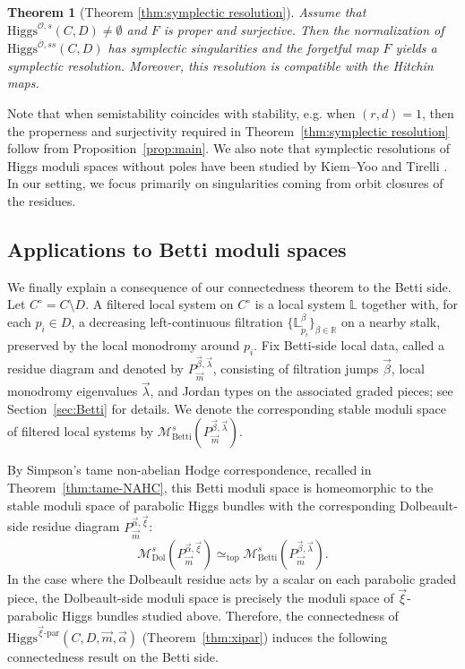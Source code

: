 \documentclass[11pt]{amsart}
\theoremstyle{plain}
\newtheorem{theorem}{Theorem}[section]
\theoremstyle{definition}
\theoremstyle{remark}
\newcommand{\cO}{\mathcal O}
\newcommand{\Higgs}{\mathrm{Higgs}}
\def\a{\alpha}
\def\vxi{\vec{\xi}}
\def\vm{\vec{m}}
\def\va{\vec{\a}}
\begin{document}
\begin{theorem}[Theorem \ref{thm:symplectic resolution}]
Assume that $\Higgs^{\cO, s}(C,D)\neq \emptyset$ and $F$ is proper and surjective. 
        Then the normalization of $\Higgs^{\overline{\cO}, ss}(C,D)$ has symplectic singularities and the forgetful map $F$ yields a symplectic resolution. Moreover, this resolution is compatible with the Hitchin maps. 
  
\end{theorem}
Note that when semistability coincides with stability, e.g. when $(r,d)=1$, then the properness and surjectivity required in Theorem~\ref{thm:symplectic resolution} follow from Proposition~\ref{prop:main}. We also note that symplectic resolutions of Higgs moduli spaces without poles have been studied by Kiem--Yoo \cite{KiemYoo} and Tirelli \cite{Tirelli2019SymplecticResolutionsHiggs}. In our setting, we focus primarily on singularities coming from orbit closures of the residues.



\subsection{Applications to Betti moduli spaces}

We finally explain a consequence of our connectedness theorem to the Betti side. Let
$C^\circ=C\setminus D$. A filtered local system on $C^\circ$ is a local system
$\mathbb L$ together with, for each $p_i\in D$, a decreasing left-continuous
filtration $\{\mathbb L_{\widetilde p_i}^{\beta}\}_{\beta\in\mathbb R}$
on a nearby stalk, preserved by the local monodromy around $p_i$. Fix Betti-side
local data, called a residue diagram and denoted by
$P^{\vec\beta,\vec\lambda}_{\vec m}$, consisting of filtration jumps $\vec\beta$,
local monodromy eigenvalues $\vec\lambda$, and Jordan types on the associated
graded pieces; see Section~\ref{sec:Betti} for details. We denote the corresponding
stable moduli space of filtered local systems by $\mathcal M^{s}_{\mathrm{Betti}}(P^{\vec\beta,\vec\lambda}_{\vec m})$.

By Simpson's tame non-abelian Hodge correspondence, recalled in
Theorem~\ref{thm:tame-NAHC}, this Betti moduli space is homeomorphic to the stable
moduli space of parabolic Higgs bundles with the corresponding Dolbeault-side
residue diagram $P^{\vec\alpha,\vec\xi}_{\vec m}$:
\[
\mathcal M^{s}_{\mathrm{Dol}}(P^{\vec\alpha,\vec\xi}_{\vec m})
\simeq_{\mathrm{top}}
\mathcal M^{s}_{\mathrm{Betti}}(P^{\vec\beta,\vec\lambda}_{\vec m}).
\]
In the case where the Dolbeault residue acts by a scalar on each parabolic
graded piece, the Dolbeault-side moduli space is precisely the moduli space of
$\vec\xi$-parabolic Higgs bundles studied above. Therefore, the connectedness of $\Higgs^{\vxi\text{-par}}(C,D,\vm,\va)$ (Theorem~\ref{thm:xipar})
induces the following connectedness result on the Betti side. 
\end{document}
